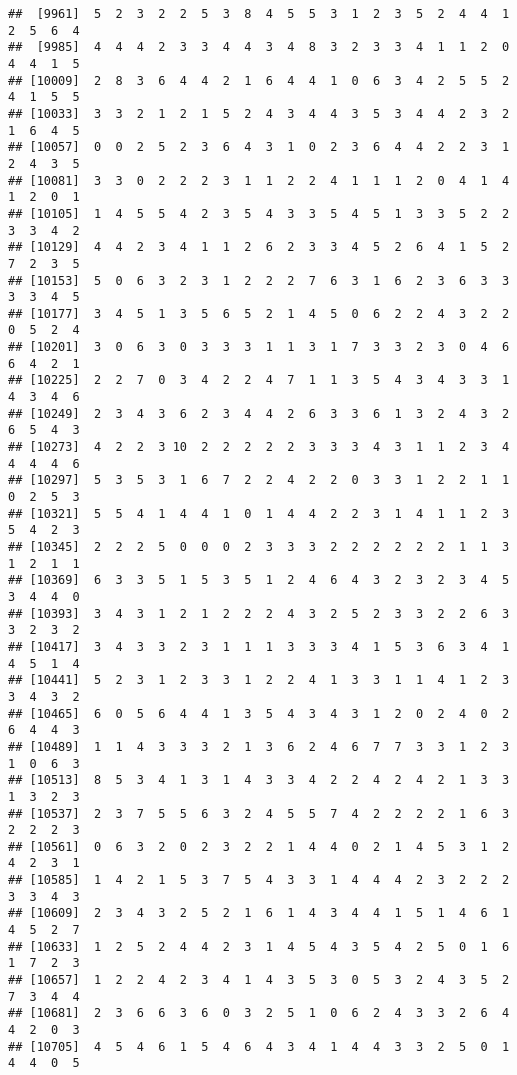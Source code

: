 \documentclass[
]{article}
\begin{document}
\begin{verbatim}
##  [9961]  5  2  3  2  2  5  3  8  4  5  5  3  1  2  3  5  2  4  4  1  2  5  6  4
##  [9985]  4  4  4  2  3  3  4  4  3  4  8  3  2  3  3  4  1  1  2  0  4  4  1  5
## [10009]  2  8  3  6  4  4  2  1  6  4  4  1  0  6  3  4  2  5  5  2  4  1  5  5
## [10033]  3  3  2  1  2  1  5  2  4  3  4  4  3  5  3  4  4  2  3  2  1  6  4  5
## [10057]  0  0  2  5  2  3  6  4  3  1  0  2  3  6  4  4  2  2  3  1  2  4  3  5
## [10081]  3  3  0  2  2  2  3  1  1  2  2  4  1  1  1  2  0  4  1  4  1  2  0  1
## [10105]  1  4  5  5  4  2  3  5  4  3  3  5  4  5  1  3  3  5  2  2  3  3  4  2
## [10129]  4  4  2  3  4  1  1  2  6  2  3  3  4  5  2  6  4  1  5  2  7  2  3  5
## [10153]  5  0  6  3  2  3  1  2  2  2  7  6  3  1  6  2  3  6  3  3  3  3  4  5
## [10177]  3  4  5  1  3  5  6  5  2  1  4  5  0  6  2  2  4  3  2  2  0  5  2  4
## [10201]  3  0  6  3  0  3  3  3  1  1  3  1  7  3  3  2  3  0  4  6  6  4  2  1
## [10225]  2  2  7  0  3  4  2  2  4  7  1  1  3  5  4  3  4  3  3  1  4  3  4  6
## [10249]  2  3  4  3  6  2  3  4  4  2  6  3  3  6  1  3  2  4  3  2  6  5  4  3
## [10273]  4  2  2  3 10  2  2  2  2  2  3  3  3  4  3  1  1  2  3  4  4  4  4  6
## [10297]  5  3  5  3  1  6  7  2  2  4  2  2  0  3  3  1  2  2  1  1  0  2  5  3
## [10321]  5  5  4  1  4  4  1  0  1  4  4  2  2  3  1  4  1  1  2  3  5  4  2  3
## [10345]  2  2  2  5  0  0  0  2  3  3  3  2  2  2  2  2  2  1  1  3  1  2  1  1
## [10369]  6  3  3  5  1  5  3  5  1  2  4  6  4  3  2  3  2  3  4  5  3  4  4  0
## [10393]  3  4  3  1  2  1  2  2  2  4  3  2  5  2  3  3  2  2  6  3  3  2  3  2
## [10417]  3  4  3  3  2  3  1  1  1  3  3  3  4  1  5  3  6  3  4  1  4  5  1  4
## [10441]  5  2  3  1  2  3  3  1  2  2  4  1  3  3  1  1  4  1  2  3  3  4  3  2
## [10465]  6  0  5  6  4  4  1  3  5  4  3  4  3  1  2  0  2  4  0  2  6  4  4  3
## [10489]  1  1  4  3  3  3  2  1  3  6  2  4  6  7  7  3  3  1  2  3  1  0  6  3
## [10513]  8  5  3  4  1  3  1  4  3  3  4  2  2  4  2  4  2  1  3  3  1  3  2  3
## [10537]  2  3  7  5  5  6  3  2  4  5  5  7  4  2  2  2  2  1  6  3  2  2  2  3
## [10561]  0  6  3  2  0  2  3  2  2  1  4  4  0  2  1  4  5  3  1  2  4  2  3  1
## [10585]  1  4  2  1  5  3  7  5  4  3  3  1  4  4  4  2  3  2  2  2  3  3  4  3
## [10609]  2  3  4  3  2  5  2  1  6  1  4  3  4  4  1  5  1  4  6  1  4  5  2  7
## [10633]  1  2  5  2  4  4  2  3  1  4  5  4  3  5  4  2  5  0  1  6  1  7  2  3
## [10657]  1  2  2  4  2  3  4  1  4  3  5  3  0  5  3  2  4  3  5  2  7  3  4  4
## [10681]  2  3  6  6  3  6  0  3  2  5  1  0  6  2  4  3  3  2  6  4  4  2  0  3
## [10705]  4  5  4  6  1  5  4  6  4  3  4  1  4  4  3  3  2  5  0  1  4  4  0  5

\end{verbatim}
\end{document}
